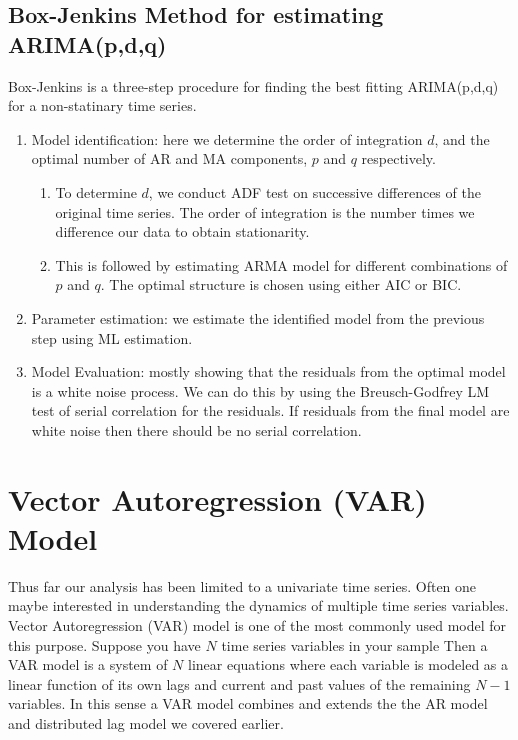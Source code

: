 \documentclass[]{book}
\theoremstyle{definition}
\theoremstyle{definition}
\theoremstyle{definition}
\theoremstyle{remark}
\begin{document}
\hypertarget{box-jenkins-method-for-estimating-arimapdq}{%
\section{Box-Jenkins Method for estimating ARIMA(p,d,q)}\label{box-jenkins-method-for-estimating-arimapdq}}

Box-Jenkins is a three-step procedure for finding the best fitting ARIMA(p,d,q) for a non-statinary time series.

\begin{enumerate}
\def\labelenumi{\arabic{enumi}.}
\item
  Model identification: here we determine the order of integration \(d\), and the optimal number of AR and MA components, \(p\) and \(q\) respectively.

  \begin{enumerate}
  \def\labelenumii{\roman{enumii}.}
  \item
    To determine \(d\), we conduct ADF test on successive differences of the original time series. The order of integration is the number times we difference our data to obtain stationarity.
  \item
    This is followed by estimating ARMA model for different combinations of \(p\) and \(q\). The optimal structure is chosen using either AIC or BIC.
  \end{enumerate}
\item
  Parameter estimation: we estimate the identified model from the previous step using ML estimation.
\item
  Model Evaluation: mostly showing that the residuals from the optimal model is a white noise process. We can do this by using the Breusch-Godfrey LM test of serial correlation for the residuals. If residuals from the final model are white noise then there should be no serial correlation.
\end{enumerate}

\hypertarget{vector-autoregression-var-model}{%
\chapter{Vector Autoregression (VAR) Model}\label{vector-autoregression-var-model}}

Thus far our analysis has been limited to a univariate time series. Often one maybe interested in understanding the dynamics of multiple time series variables. Vector Autoregression (VAR) model is one of the most commonly used model for this purpose. Suppose you have \(N\) time series variables in your sample Then a VAR model is a system of \(N\) linear equations where each variable is modeled as a linear function of its own lags and current and past values of the remaining \(N-1\) variables. In this sense a VAR model combines and extends the the AR model and distributed lag model we covered earlier.
\end{document}
